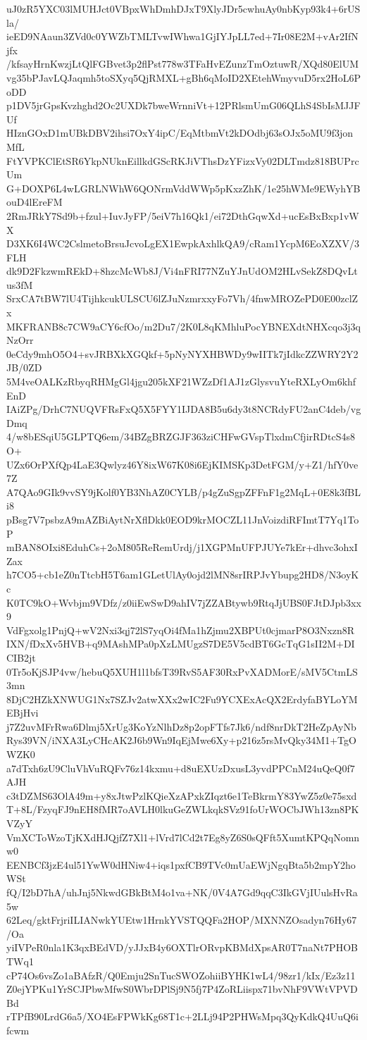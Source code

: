 uJ0zR5YXC03lMUHJct0VBpxWhDmhDJxT9XlyJDr5cwhuAy0nbKyp93k4+6rUSla/
ieED9NAaun3ZVd0c0YWZbTMLTvwIWhwa1GjIYJpLL7ed+7Ir08E2M+vAr2IfNjfx
/kfsayHrnKwzjLtQlFGBvet3p2flPst778w3TFaHvEZunzTmOztuwR/XQd80ElUM
vg35bPJavLQJaqmh5toSXyq5QjRMXL+gBh6qMoID2XEtehWmyvuD5rx2HoL6PoDD
p1DV5jrGpsKvzhghd2Oc2UXDk7bweWrnniVt+12PRlsmUmG06QLhS4SbIsMJJFUf
HIznGOxD1mUBkDBV2ihsi7OxY4ipC/EqMtbmVt2kDOdbj63sOJx5oMU9f3jonMfL
FtYVPKClEtSR6YkpNUknEillkdGScRKJiVThsDzYFizxVy02DLTmdz818BUPrcUm
G+DOXP6L4wLGRLNWhW6QONrmVddWWp5pKxzZhK/1e25hWMe9EWyhYBouD4lEreFM
2RmJRkY7Sd9b+fzul+IuvJyFP/5eiV7h16Qk1/ei72DthGqwXd+ucEsBxBxp1vWX
D3XK6I4WC2CslmetoBrsuJcvoLgEX1EwpkAxhlkQA9/cRam1YcpM6EoXZXV/3FLH
dk9D2FkzwmREkD+8hzcMcWb8J/Vi4nFRI77NZuYJnUdOM2HLvSekZ8DQvLtus3fM
SrxCA7tBW7lU4TijhkcukULSCU6lZJuNzmrxxyFo7Vh/4fnwMROZePD0E00zclZx
MKFRANB8c7CW9aCY6cfOo/m2Du7/2K0L8qKMhluPocYBNEXdtNHXcqo3j3qNzOrr
0eCdy9mhO5O4+svJRBXkXGQkf+5pNyNYXHBWDy9wIITk7jIdkcZZWRY2Y2JB/0ZD
5M4veOALKzRbyqRHMgGl4jgu205kXF21WZzDf1AJ1zGlysvuYteRXLyOm6khfEnD
IAiZPg/DrhC7NUQVFRsFxQ5X5FYY1IJDA8B5u6dy3t8NCRdyFU2anC4deb/vgDmq
4/w8bESqiU5GLPTQ6em/34BZgBRZGJF363ziCHFwGVspTlxdmCfjirRDtcS4s8O+
UZx6OrPXfQp4LaE3Qwlyz46Y8ixW67K08i6EjKIMSKp3DetFGM/y+Z1/hfY0ve7Z
A7QAo9GIk9vvSY9jKolf0YB3NhAZ0CYLB/p4gZuSgpZFFnF1g2MqL+0E8k3fBLi8
pBsg7V7psbzA9mAZBiAytNrXflDkk0EOD9krMOCZL11JnVoizdiRFImtT7Yq1ToP
mBAN8OIxi8EduhCs+2oM805ReRemUrdj/j1XGPMnUFPJUYe7kEr+dhvc3ohxIZax
h7CO5+cb1eZ0nTtcbH5T6am1GLetUlAy0ojd2lMN8srIRPJvYbupg2HD8/N3oyKc
K0TC9kO+Wvbjm9VDfz/z0iiEwSwD9ahIV7jZZABtywb9RtqJjUBS0FJtDJpb3xx9
VdFgxolg1PnjQ+wV2Nxi3qj72lS7yqOi4fMa1hZjmu2XBPUt0cjmarP8O3Nxzn8R
IXN/fDxXv5HVB+q9MAshMPa0pXzLMUgzS7DE5V5cdBT6GcTqG1sII2M+DICIB2jt
0Tr5oKjSJP4vw/hebuQ5XUH1l1bfsT39RvS5AF30RxPvXADMorE/sMV5CtmLS3mn
8DjC2HZkXNWUG1Nx7SZJv2atwXXx2wIC2Fu9YCXExAcQX2ErdyfaBYLoYMEBjHvi
j7Z2uvMFrRwa6Dlmj5XrUg3KoYzNlhDz8p2opFTfs7Jk6/ndf8nrDkT2HeZpAyNb
Rys39VN/iNXA3LyCHcAK2J6b9Wn9IqEjMwe6Xy+p216z5rsMvQky34M1+TgOWZK0
a7dTxh6zU9CluVhVuRQFv76z14kxmu+d8uEXUzDxusL3yvdPPCnM24uQeQ0f7AJH
c3tDZMS63OlA49m+y8xJtwPzlKQieXzAPxkZIqzt6e1TeBkrmY83YwZ5z0e75sxd
T+8L/FzyqFJ9nEH8fMR7oAVLH0lkuGeZWLkqkSVz91foUrWOCbJWh13zn8PKVZyY
VmXCToWzoTjKXdHJQjfZ7Xl1+lVrd7lCd2t7Eg8yZ6S0sQFft5XumtKPQqNomnw0
EENBCf3jzE4ul51YwW0dHNiw4+iqs1pxfCB9TVc0mUaEWjNgqBta5b2mpY2hoWSt
fQ/I2bD7hA/uhJnj5NkwdGBkBtM4o1va+NK/0V4A7Gd9qqC3IkGVjIUulsHvRa5w
62Leq/gktFrjriILIANwkYUEtw1HrnkYVSTQQFa2HOP/MXNNZOsadyn76Hy67/Oa
yiIVPeR0nla1K3qxBEdVD/yJJxB4y6OXTlrORvpKBMdXpsAR0T7naNt7PHOBTWq1
cP74Os6vsZo1aBAfzR/Q0Emju2SnTucSWOZohiiBYHK1wL4/98zr1/kIx/Ez3z11
Z0ejYPKu1YrSCJPbwMfwS0WbrDPlSj9N5fj7P4ZoRLiispx71bvNhF9VWtVPVDBd
rTPfB90LrdG6a5/XO4EsFPWkKg68T1c+2LLj94P2PHWsMpq3QyKdkQ4UuQ6ifcwm
